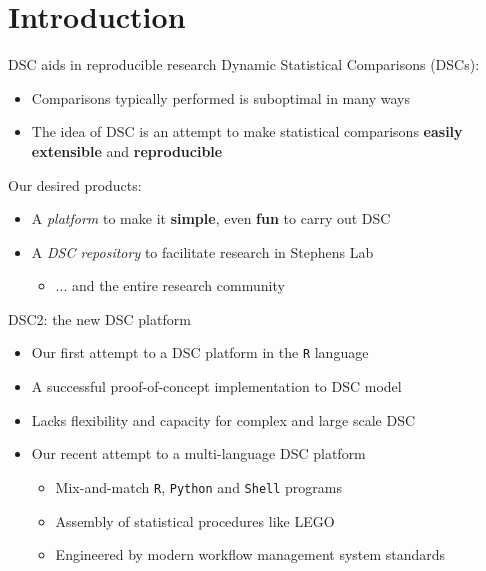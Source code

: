 
\section{Introduction}
\begin{frame}{DSC aids in reproducible research}
  Dynamic Statistical Comparisons (DSCs):
\begin{itemize}
\item Comparisons typically performed is suboptimal in many ways
\item The idea of DSC is an attempt to make statistical comparisons
  \textbf{easily extensible} and \textbf{reproducible}
\end{itemize}
\bigskip
Our desired products: 
\begin{itemize}
\pause \item A \textit{platform} to make it \textbf{simple}, even \textbf{fun} to carry out DSC
\item A \textit{DSC repository} to facilitate research in Stephens Lab
\begin{itemize}
  \item ... and the entire research community
\end{itemize}
\end{itemize}
\end{frame}

\begin{frame}{DSC2: the new DSC platform}
  \dscr
\begin{itemize}
  \item Our first attempt to a DSC platform in the \texttt{R} language
  \item A successful proof-of-concept implementation to DSC model
  \item Lacks flexibility and capacity for complex and large scale DSC 
\end{itemize}
\bigskip
  \dscii
\begin{itemize}
  \item Our recent attempt to a multi-language DSC platform 
    \begin{itemize}
      \item Mix-and-match \texttt{R}, \texttt{Python} and \texttt{Shell} programs 
      \item Assembly of statistical procedures like LEGO 
      \item Engineered by modern workflow management system standards
     \end{itemize}
\end{itemize}
\end{frame}

